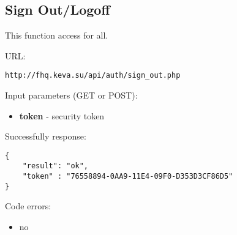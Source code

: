 \subsection{Sign Out/Logoff}
\par

This function access for all.

URL:
\begin{Verbatim}[frame=single]
http://fhq.keva.su/api/auth/sign_out.php
\end{Verbatim}

Input parameters (GET or POST):
\begin{itemize}
  \item \textbf{token} - security token
\end{itemize}

Successfully response:  \\
\begin{Verbatim}[frame=single]
{
    "result": "ok",
    "token" : "76558894-0AA9-11E4-09F0-D353D3CF86D5"
}
\end{Verbatim}

Code errors:
\begin{itemize}
	\item no
\end{itemize}
